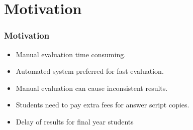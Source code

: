 \section{Motivation} 

\begin{frame}
\frametitle{Motivation}
\begin{itemize}
    \item Manual evaluation time consuming.
    \item Automated system preferred for fast evaluation.
    \item Manual evaluation can cause inconsistent results.
    \item Students need to pay extra fees for answer script copies.
    \item Delay of results for final year students
\end{itemize}
\end{frame}